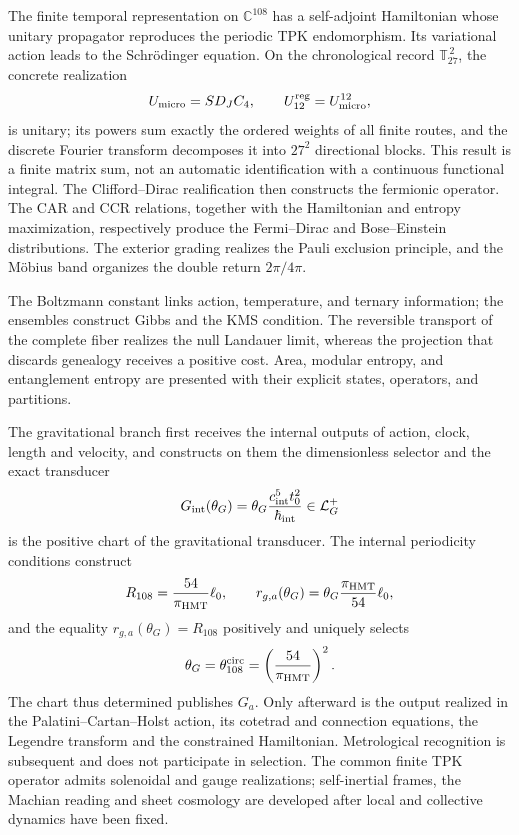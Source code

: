 The finite temporal representation on \(\mathbb C^{108}\) has a
self-adjoint Hamiltonian whose unitary propagator reproduces the periodic TPK
endomorphism. Its variational action leads to the
Schrödinger equation. On the chronological record
\(\mathbb T_{27}^{\,2}\), the concrete realization
\[
 U_{\rm micro}=S D_J C_4,
 \qquad U_{12}^{\rm reg}=U_{\rm micro}^{12},
\]
is unitary; its powers sum exactly the ordered weights of all finite routes, and the discrete Fourier transform decomposes it into \(27^2\) directional blocks. This result is a finite matrix sum, not an automatic identification with a continuous functional integral. The Clifford--Dirac realification then constructs the fermionic operator. The CAR and CCR relations, together with the Hamiltonian and entropy maximization, respectively produce the Fermi--Dirac and Bose--Einstein distributions. The exterior grading realizes the Pauli exclusion principle, and the Möbius band organizes the double return \(2\pi/4\pi\).

The Boltzmann constant links action, temperature, and ternary information;
the ensembles construct Gibbs and the KMS condition. The reversible transport
of the complete fiber realizes the null Landauer limit, whereas the
projection that discards genealogy receives a positive cost. Area, modular entropy,
and entanglement entropy are presented with their explicit states, operators,
and partitions.

The gravitational branch first receives the internal outputs of action, clock,
length and velocity, and constructs on them the dimensionless selector and the
exact transducer
\[
 G_{\rm int}(\theta_G)
 =\theta_G\frac{c_{\rm int}^{5}t_0^2}{\hbar_{\rm int}}
 \in\mathcal L_G^+
\]
is the positive chart of the gravitational transducer. The internal periodicity
conditions construct
\[
 R_{108}=\frac{54}{\pi_{\rm HMT}}\ell_0,
 \qquad
 r_{g,a}(\theta_G)
 =\theta_G\frac{\pi_{\rm HMT}}{54}\ell_0,
\]
and the equality \(r_{g,a}(\theta_G)=R_{108}\) positively and uniquely
selects
\[
 \theta_G=\theta_{108}^{\rm circ}
 =\left(\frac{54}{\pi_{\rm HMT}}\right)^2.
\]
The chart thus determined publishes \(G_a\). Only afterward is the output realized
in the Palatini--Cartan--Holst action, its cotetrad and
connection equations, the Legendre transform and the constrained Hamiltonian. Metrological
recognition is subsequent and does not participate in selection. The common finite TPK operator admits solenoidal
and gauge realizations; self-inertial frames, the Machian reading and sheet
cosmology are developed after local and collective dynamics
have been fixed.

